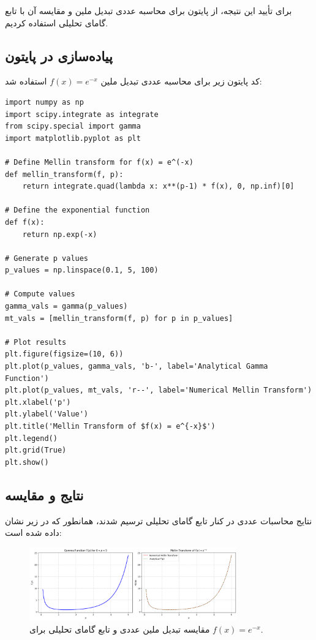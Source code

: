 \documentclass[12pt,a4paper]{article}
\begin{document}
برای تأیید این نتیجه، از پایتون برای محاسبه عددی تبدیل ملین و مقایسه آن با تابع گامای تحلیلی استفاده کردیم\cite{Code}.

\subsection{پیاده‌سازی در پایتون}
کد پایتون زیر برای محاسبه عددی تبدیل ملین $f(x) = e^{-x}$ استفاده شد:
\begin{verbatim}
import numpy as np
import scipy.integrate as integrate
from scipy.special import gamma
import matplotlib.pyplot as plt

# Define Mellin transform for f(x) = e^(-x)
def mellin_transform(f, p):
    return integrate.quad(lambda x: x**(p-1) * f(x), 0, np.inf)[0]

# Define the exponential function
def f(x):
    return np.exp(-x)

# Generate p values
p_values = np.linspace(0.1, 5, 100)

# Compute values
gamma_vals = gamma(p_values)
mt_vals = [mellin_transform(f, p) for p in p_values]

# Plot results
plt.figure(figsize=(10, 6))
plt.plot(p_values, gamma_vals, 'b-', label='Analytical Gamma Function')
plt.plot(p_values, mt_vals, 'r--', label='Numerical Mellin Transform')
plt.xlabel('p')
plt.ylabel('Value')
plt.title('Mellin Transform of $f(x) = e^{-x}$')
plt.legend()
plt.grid(True)
plt.show()
\end{verbatim}

\subsection{نتایج و مقایسه}
نتایج محاسبات عددی در کنار تابع گامای تحلیلی ترسیم شدند، همانطور که در زیر نشان داده شده است:

\begin{figure}[H]
    \centering
    \includegraphics[width=0.8\textwidth]{Prooving Gamma function.png}
    \caption{مقایسه تبدیل ملین عددی و تابع گامای تحلیلی برای $f(x) = e^{-x}$.}
    \label{fig:gamma_vs_mellin}
\end{figure}
\end{document}
